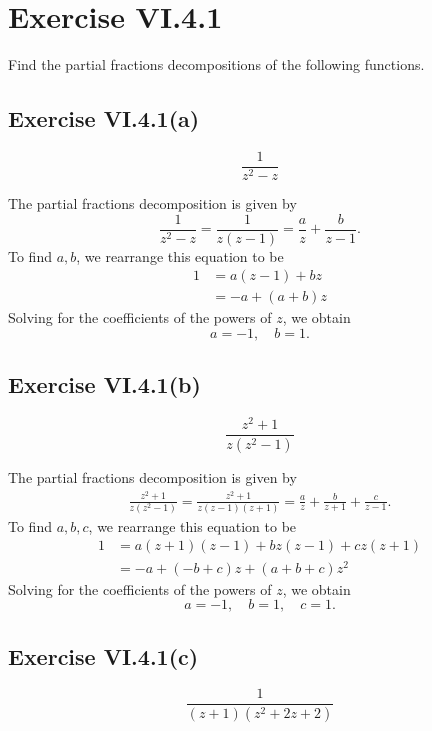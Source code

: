 \documentclass[12pt]{article}
\newenvironment{pbox}
    {\begin{lrbox}{\mybox}\begin{minipage}{0.98\textwidth}}
    {\end{minipage}\end{lrbox}\begin{center}\framebox[\textwidth]{\usebox{\mybox}}\end{center}}
\theoremstyle{definition}
\begin{document}
\newpage
\section{Exercise VI.4.1}
\begin{pbox}
    Find the partial fractions decompositions of the following functions.
\end{pbox}

\subsection{Exercise VI.4.1(a)}
\begin{pbox}
    \[
        \frac{1}{z^2 - z}
    \]
\end{pbox}

The partial fractions decomposition is given by
\[
    \frac{1}{z^2 - z}
        = \frac{1}{z(z-1)}
        = \frac{a}{z} + \frac{b}{z - 1}.
\]
To find $a, b$, we rearrange this equation to be
\begin{align*}
    1 
        &= a(z - 1) + bz \\
        &= -a + (a + b) z
\end{align*}
Solving for the coefficients of the powers of $z$, we obtain
\[
    a = -1, \quad b = 1.
\]

\subsection{Exercise VI.4.1(b)}
\begin{pbox}
    \[
        \frac{z^2 + 1}{z(z^2 - 1)}
    \]
\end{pbox}

The partial fractions decomposition is given by
\begin{align*}
    \frac{z^2 + 1}{z(z^2 - 1)}
        = \frac{z^2 + 1}{z(z - 1)(z + 1)} 
        = \frac{a}{z} + \frac{b}{z + 1} + \frac{c}{z - 1}.
\end{align*}
To find $a, b, c$, we rearrange this equation to be
\begin{align*}
    1 
        &= a(z + 1)(z - 1) + bz(z - 1) + cz(z + 1) \\
        &= -a + (-b + c) z + (a + b + c) z^2
\end{align*}
Solving for the coefficients of the powers of $z$, we obtain
\[
    a = -1, \quad b = 1, \quad c = 1.
\]

\subsection{Exercise VI.4.1(c)}
\begin{pbox}
    \[
        \frac{1}{(z + 1)(z^2 + 2z + 2)}
    \]
\end{pbox}
\end{document}
